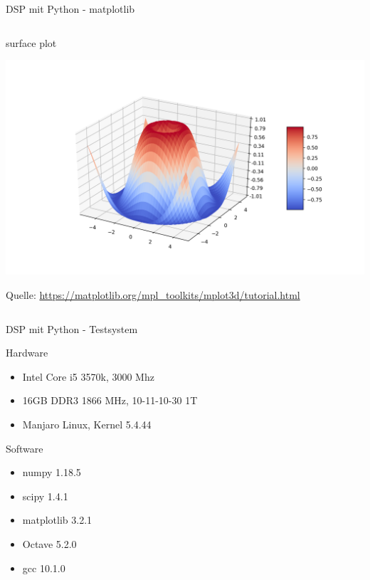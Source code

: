 \documentclass[8pt]{beamer}
\begin{document}
\begin{frame}[label={sec:org65daa74}]{DSP mit Python - matplotlib}
\begin{columns}
\begin{column}{1\columnwidth}
\begin{block}{surface plot}
\begin{center}
\includegraphics[width=.9\linewidth]{./image/3d_python.png}
\end{center}
\vspace{1mm}
Quelle:
\url{https://matplotlib.org/mpl\_toolkits/mplot3d/tutorial.html} 
\end{block}
\end{column}
\end{columns}
\end{frame}


\begin{frame}[label={sec:orgba2db7a}]{DSP mit Python - Testsystem}
\begin{block}{Hardware}
\begin{itemize}
\item Intel Core i5 3570k, 3000 Mhz
\item 16GB DDR3 1866 MHz, 10-11-10-30 1T
\item Manjaro Linux, Kernel 5.4.44
\end{itemize}
\end{block}

\begin{block}{Software}
\begin{itemize}
\item numpy 1.18.5
\item scipy 1.4.1
\item matplotlib 3.2.1
\item Octave 5.2.0
\item gcc 10.1.0
\end{itemize}
\end{block}
\end{frame}
\end{document}
